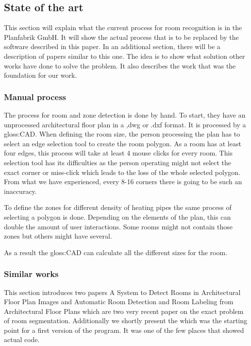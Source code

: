 \subsection{State of the art}
This section will explain what the current process for room recognition is in the Planfabrik GmbH. It will show the actual process that is to be replaced by the software described in this paper. In an additional section, there will be a description of papers similar to this one. The idea is to show what solution other works have done to solve the problem. It also describes the work that was the foundation for our work.

\subsubsection{Manual process}
 The process for room and zone detection is done by hand. To start, they have an unprocessed architectural floor plan in a ,dwg or .dxf format. It is processed by a \gls{gloss:CAD}. When defining the room size, the person processing the plan has to select an edge selection tool to create the room polygon. As a room has at least four edges, this process will take at least 4 mouse clicks for every room. This selection tool has its difficulties as the person operating might not select the exact corner or miss-click which leads to the loss of the whole selected polygon. From what we have experienced, every 8-16 corners there is going to be such an inaccuracy. 
 
 To define the zones for different density of heating pipes the same process of selecting a polygon is done. Depending on the elements of the plan, this can double the amount of user interactions. Some rooms might not contain those zones but others might have several.
 
 As a result the \gls{gloss:CAD} can calculate all the different sizes for the room.
 
\subsubsection{Similar works}
This section introduces two papers A System to Detect Rooms in Architectural Floor Plan Images \citep[10]{mace_valveny_loctea_tabbone_2010} and Automatic Room Detection and Room Labeling from Architectural Floor Plans \citep[1]{ahmed_liwicki_weber_dengel_2012} which are two very recent paper on the exact problem of room segmentation. Additionally we shortly present the \citep[1]{nikieroomdet} which was the starting point for a first version of the program. It was one of the few places that showed actual code. 

